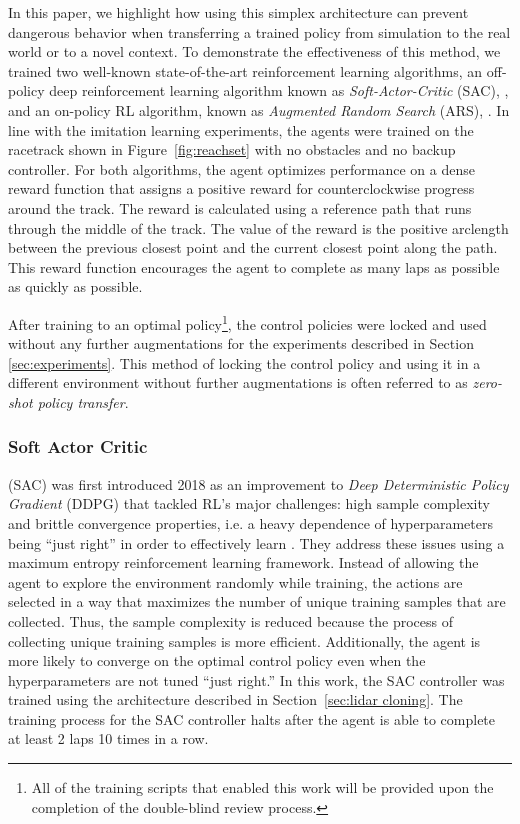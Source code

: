 \documentclass[manuscript,screen,review]{acmart}
\newcommand{\figref}[1]{Figure~\ref{#1}}
\begin{document}
In this paper, we highlight how using this simplex architecture can prevent dangerous behavior when transferring a trained policy from simulation to the real world or to a novel context.
To demonstrate the effectiveness of this method, we trained two well-known state-of-the-art reinforcement learning algorithms, an off-policy deep reinforcement learning algorithm known as \emph{Soft-Actor-Critic} (SAC), \cite{haarnoja2018soft}, and an on-policy RL algorithm, known as \emph{Augmented Random Search} (ARS), \cite{mania2018simple}. %
In line with the imitation learning experiments, the agents were trained on the racetrack shown in \figref{fig:reachset} with no obstacles and no backup controller. For both algorithms, the agent optimizes performance on a dense reward function that assigns a positive reward for counterclockwise progress around the track. The reward is calculated using a reference path that runs through the middle of the track. The value of the reward is the positive arclength between the previous closest point and the current closest point along the path. This reward function encourages the agent to complete as many laps as possible as quickly as possible.

After training to an optimal policy\footnote{All of the training scripts that enabled this work will be provided upon the completion of the double-blind review process.}, the control policies were locked and used without any further augmentations for the experiments described in Section \ref{sec:experiments}. This method of locking the control policy and using it in a different environment without further augmentations is often referred to as \emph{zero-shot policy transfer}.


\subsubsection{Soft Actor Critic}
(SAC) was first introduced 2018 as an improvement to \emph{Deep Deterministic Policy Gradient} (DDPG) that tackled RL's major challenges: high sample complexity and brittle convergence properties, i.e. a heavy dependence of hyperparameters being ``just right'' in order to effectively learn \cite{haarnoja2018soft}. They address these issues using a maximum entropy reinforcement learning framework. Instead of allowing the agent to explore the environment randomly while training, the actions are selected in a way that maximizes the number of unique training samples that are collected. Thus, the sample complexity is reduced because the process of collecting unique training samples is more efficient. Additionally, the agent is more likely to converge on the optimal control policy even when the hyperparameters are not tuned ``just right.'' In this work, the SAC controller was trained
using the architecture described in Section~\ref{sec:lidar cloning}. The training process for the SAC controller halts after the agent is able to complete at least 2 laps 10 times in a row.
\end{document}
